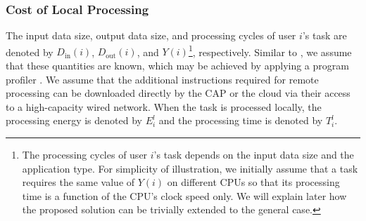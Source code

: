 \documentclass[10pt,journal,compsoc]{IEEEtran}
\begin{document}
\subsubsection{Cost of Local Processing}
The input data size, output data size, and processing cycles of user
$i$'s task are denoted by $D_{{\textrm{in}}}(i)$,
$D_{{\textrm{out}}}(i)$, and $Y(i)$\footnote{The processing cycles
of user $i$'s task depends on the input data size and the
application type. For simplicity of illustration, we initially
assume that a task requires the same value of $Y(i)$ on different
CPUs so that its processing time is a function of the CPU's clock
speed only. We will explain later how the proposed solution can be
trivially extended to the general case.}, respectively. Similar to
\cite{wen2012,barbarossa2013,munoz2015,sardellitti2015,chen2014,meskar2017,chen2015efficient,lyu2017},
 we assume that these quantities are known,
 which may be achieved by applying
a program profiler \cite{cuervo2010, chun2011,kosta2012}. We assume
that the additional instructions required for remote processing can
be downloaded directly by the CAP or the cloud via their access to a
high-capacity wired network.
 When the task is
processed locally, the processing energy is denoted by $E^l_{i}$ and
the processing time is denoted by $T^l_{i}$.
\end{document}
